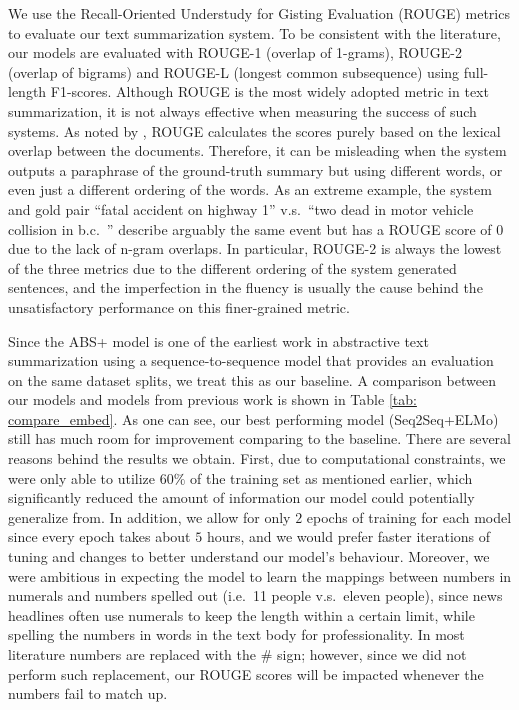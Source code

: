 We use the Recall-Oriented Understudy for Gisting Evaluation (ROUGE) metrics \cite{lin2004rouge} to evaluate our text summarization system. To be consistent with the literature, our models are evaluated with ROUGE-1 (overlap of 1-grams), ROUGE-2 (overlap of bigrams) and ROUGE-L (longest common subsequence) using full-length F1-scores. Although ROUGE is the most widely adopted metric in text summarization, it is not always effective when measuring the success of such systems. As noted by \cite{cohan2016revisiting}, ROUGE calculates the scores purely based on the lexical overlap between the documents. Therefore, it can be misleading when the system outputs a paraphrase of the ground-truth summary but using different words, or even just a different ordering of the words. As an extreme example, the system and gold pair ``fatal accident on highway 1'' v.s.\ ``two dead in motor vehicle collision in b.c.\ '' describe arguably the same event but has a ROUGE score of $0$ due to the lack of n-gram overlaps. In particular, ROUGE-2 is always the lowest of the three metrics due to the different ordering of the system generated sentences, and the imperfection in the fluency is usually the cause behind the unsatisfactory performance on this finer-grained metric.

Since the ABS+ model \cite{rush2015neural} is one of the earliest work in abstractive text summarization using a sequence-to-sequence model that provides an evaluation on the same dataset splits, we treat this as our baseline. A comparison between our models and models from previous work is shown in Table \ref{tab: compare_embed}. As one can see, our best performing model (Seq2Seq+ELMo) still has much room for improvement comparing to the baseline. There are several reasons behind the results we obtain. First, due to computational constraints, we were only able to utilize $60\%$ of the training set as mentioned earlier, which significantly reduced the amount of information our model could potentially generalize from. In addition, we allow for only $2$ epochs of training for each model since every epoch takes about $5$ hours, and we would prefer faster iterations of tuning and changes to better understand our model's behaviour. Moreover, we were ambitious in expecting the model to learn the mappings between numbers in numerals and numbers spelled out (i.e.\ 11 people v.s.\ eleven people), since news headlines often use numerals to keep the length within a certain limit, while spelling the numbers in words in the text body for professionality. In most literature numbers are replaced with the $\#$ sign; however, since we did not perform such replacement, our ROUGE scores will be impacted whenever the numbers fail to match up. 

